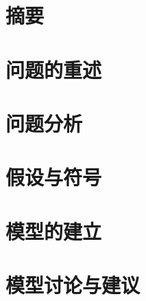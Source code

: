 \documentclass{xcumcmart}
\begin{document}
\section*{摘要}

\section{问题的重述}

\section{问题分析}

\section{假设与符号}

\section{模型的建立}


\section{模型讨论与建议}

\end{document}
